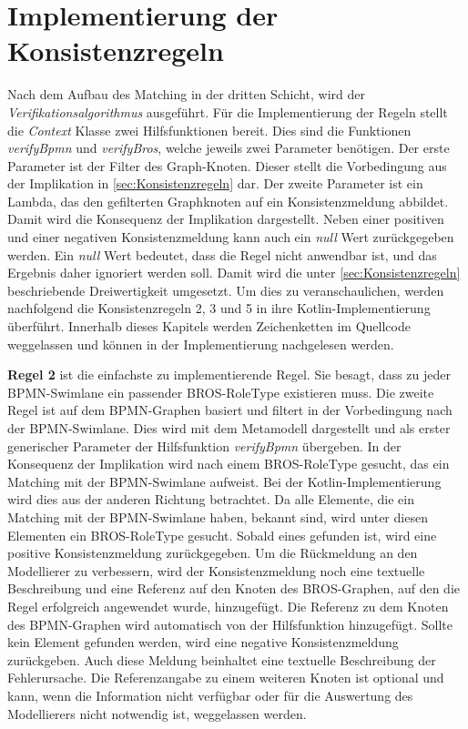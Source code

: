 \section{Implementierung der Konsistenzregeln}
\label{sec:implementaion_consistency_rules}

Nach dem Aufbau des Matching in der dritten Schicht, wird der \emph{Verifikationsalgorithmus} ausgeführt.
Für die Implementierung der Regeln stellt die \emph{Context} Klasse zwei Hilfsfunktionen bereit.
Dies sind die Funktionen \emph{verifyBpmn} und \emph{verifyBros}, welche jeweils zwei Parameter benötigen.
Der erste Parameter ist der Filter des Graph-Knoten.
Dieser stellt die Vorbedingung aus der Implikation in \cref{sec:Konsistenzregeln} dar.
Der zweite Parameter ist ein Lambda, das den gefilterten Graphknoten auf ein Konsistenzmeldung abbildet.
Damit wird die Konsequenz der Implikation dargestellt.
Neben einer positiven und einer negativen Konsistenzmeldung kann auch ein \emph{null} Wert zurückgegeben werden.
Ein \emph{null} Wert bedeutet, dass die Regel nicht anwendbar ist, und das Ergebnis daher ignoriert werden soll.
Damit wird die unter \cref{sec:Konsistenzregeln} beschriebende Dreiwertigkeit umgesetzt.
Um dies zu veranschaulichen, werden nachfolgend die Konsistenzregeln 2, 3 und 5 in ihre Kotlin-Implementierung überführt.
Innerhalb dieses Kapitels werden Zeichenketten im Quellcode weggelassen und können in der Implementierung nachgelesen werden.

\textbf{Regel 2} ist die einfachste zu implementierende Regel.
Sie besagt, dass zu jeder BPMN-Swimlane ein passender BROS-RoleType existieren muss.
Die zweite Regel ist auf dem BPMN-Graphen basiert und filtert in der Vorbedingung nach der BPMN-Swimlane.
Dies wird mit dem Metamodell dargestellt und als erster generischer Parameter der Hilfsfunktion \emph{verifyBpmn} übergeben.
In der Konsequenz der Implikation wird nach einem BROS-RoleType gesucht, das ein Matching mit der BPMN-Swimlane aufweist.
Bei der Kotlin-Implementierung wird dies aus der anderen Richtung betrachtet.
Da alle Elemente, die ein Matching mit der BPMN-Swimlane haben, bekannt sind, wird unter diesen Elementen ein BROS-RoleType gesucht.
Sobald eines gefunden ist, wird eine positive Konsistenzmeldung zurückgegeben.
Um die Rückmeldung an den Modellierer zu verbessern, wird der Konsistenzmeldung noch eine textuelle Beschreibung und eine Referenz auf den Knoten des BROS-Graphen, auf den die Regel erfolgreich angewendet wurde, hinzugefügt.
Die Referenz zu dem Knoten des BPMN-Graphen wird automatisch von der Hilfsfunktion hinzugefügt.
Sollte kein Element gefunden werden, wird eine negative Konsistenzmeldung zurückgeben.
Auch diese Meldung beinhaltet eine textuelle Beschreibung der Fehlerursache.
Die Referenzangabe zu einem weiteren Knoten ist optional und kann, wenn die Information nicht verfügbar oder für die Auswertung des Modellierers nicht notwendig ist, weggelassen werden.

